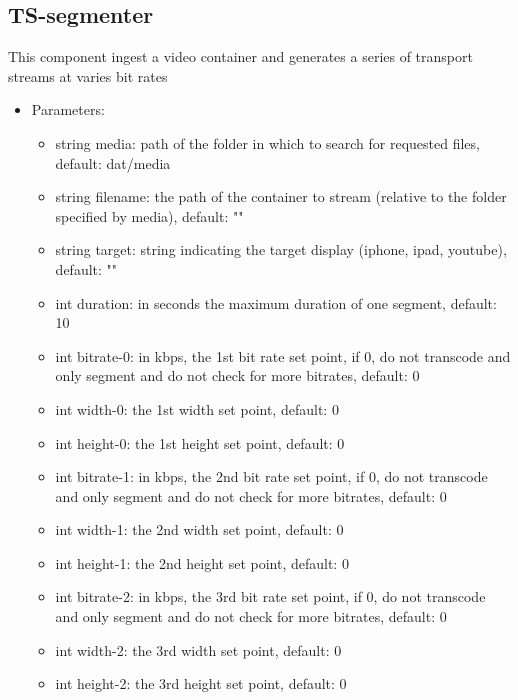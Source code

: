 \subsection{TS-segmenter}
This component ingest a video container and generates a series of transport streams at varies bit rates
\begin{itemize}
\item Parameters:
\begin{itemize}
\item string media: path of the folder in which to search for requested files, default: dat/media
\item string filename: the path of the container to stream (relative to the folder specified by media), default: ""
\item string target: string indicating the target display (iphone, ipad, youtube), default: ""
\item int duration: in seconds the maximum duration of one segment, default: 10
\item int bitrate-0: in kbps, the 1st bit rate set point, if 0, do not transcode and only segment and do not check for more bitrates, default: 0
\item int width-0: the 1st width set point, default: 0
\item int height-0: the 1st height set point, default: 0
\item int bitrate-1: in kbps, the 2nd bit rate set point, if 0, do not transcode and only segment and do not check for more bitrates, default: 0
\item int width-1: the 2nd width set point, default: 0
\item int height-1: the 2nd height set point, default: 0
\item int bitrate-2: in kbps, the 3rd bit rate set point, if 0, do not transcode and only segment and do not check for more bitrates, default: 0
\item int width-2: the 3rd width set point, default: 0
\item int height-2: the 3rd height set point, default: 0
\end{itemize}
\end{itemize}
